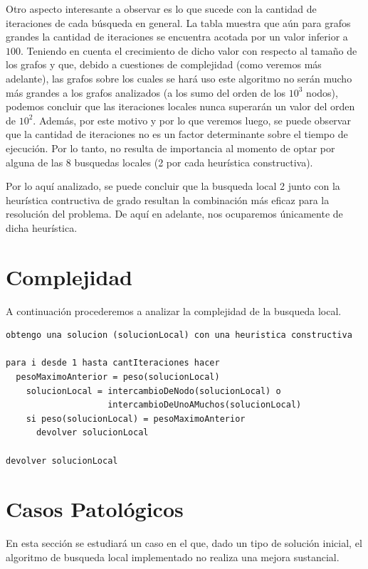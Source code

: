 \documentclass[a4paper,11pt] {article}
\begin{document}
Otro aspecto interesante a observar es lo que sucede con la cantidad de iteraciones de cada búsqueda en general. La tabla muestra que aún para grafos grandes la cantidad de iteraciones se encuentra acotada por un valor inferior a $100$. Teniendo en cuenta el crecimiento de dicho valor con respecto al tamaño de los grafos y que, debido a cuestiones de complejidad (como veremos más adelante), las grafos sobre los cuales se hará uso este algoritmo no serán mucho más grandes a los grafos analizados (a los sumo del orden de los $10^3$ nodos), podemos concluir que las iteraciones locales nunca superarán un valor del orden de $10^2$. Además, por este motivo y por lo que veremos luego, se puede observar que la cantidad de iteraciones no es un factor determinante sobre el tiempo de ejecución. Por lo tanto, no resulta de importancia al momento de optar por alguna de las 8 busquedas locales (2 por cada heurística constructiva).

Por lo aquí analizado, se puede concluir que la busqueda local 2 junto con la heurística contructiva de grado resultan la combinación más eficaz para la resolución del problema. De aquí en adelante, nos ocuparemos únicamente de dicha heurística.

\section*{Complejidad}

A continuación procederemos a analizar la complejidad de la busqueda local.

\begin{verbatim}
obtengo una solucion (solucionLocal) con una heuristica constructiva 

para i desde 1 hasta cantIteraciones hacer
  pesoMaximoAnterior = peso(solucionLocal)
    solucionLocal = intercambioDeNodo(solucionLocal) o 
                    intercambioDeUnoAMuchos(solucionLocal)
    si peso(solucionLocal) = pesoMaximoAnterior
      devolver solucionLocal

devolver solucionLocal
\end{verbatim}

\section*{Casos Patol\'ogicos}

En esta secci\'on se estudiar\'a un caso en el que, dado un tipo de soluci\'on inicial, el algoritmo de busqueda local implementado no realiza una mejora sustancial.
\end{document}
